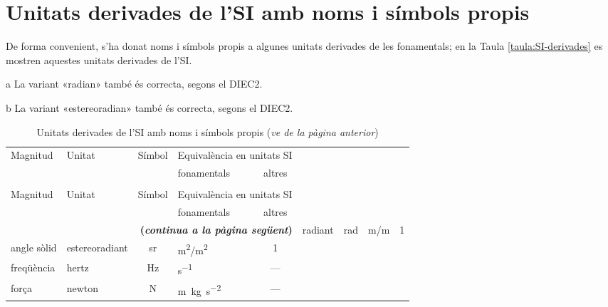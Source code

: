 \section{Unitats derivades de l'SI amb noms i símbols propis}

De forma convenient, s'ha donat noms i símbols propis a algunes unitats derivades de les fonamentals; en la Taula \vref{taula:SI-derivades} es mostren aquestes unitats derivades de l'SI.

\begin{ThreePartTable}
\begin{TableNotes}
    \item[a] {\footnotesize La variant «radian» també és correcta, segons el DIEC2.}
    \item[b] {\footnotesize La variant «estereoradian» també és correcta, segons el DIEC2.}
\end{TableNotes}
\begin{longtable}[h]{llclc}
   \caption{\label{taula:SI-derivades} Unitats derivades de
   l'SI amb noms i símbols propis}\\
   \toprule[1pt]
    \multirow{2}{15mm}{\rule{0mm}{6mm}Magnitud} & \multirow{2}{15mm}{\rule{0mm}{6mm}Unitat}  &
    \multirow{2}{15mm}{\rule{0mm}{6mm}Símbol}  & \multicolumn{2}{c}{Equivalència en unitats SI}\\
    \cmidrule(rl){4-5}
    &  &   & fonamentals & altres\\
   \midrule
   \endfirsthead
   \caption[]{Unitats derivades de l'SI amb noms i símbols propis (\emph{ve de la pàgina
   anterior})}\\
   \toprule[1pt]
    \multirow{2}{15mm}{\rule{0mm}{6mm}Magnitud} & \multirow{2}{15mm}{\rule{0mm}{6mm}Unitat}  &
    \multirow{2}{15mm}{\rule{0mm}{6mm}Símbol}  & \multicolumn{2}{c}{Equivalència en unitats SI}\\
    \cmidrule(rl){4-5}
    &  &  & fonamentals & altres\\
   \midrule
   \endhead
   \midrule
   \multicolumn{5}{r}{\sffamily\bfseries\color{NavyBlue}(\emph{continua a la pàgina següent})}
   \endfoot
   \insertTableNotes
   \endlastfoot
   angle pla & radiant\tnote{a} & rad   & \si{m/m} & 1\\
   angle sòlid & estereoradiant\tnote{b} & sr & \si{m^2/m^2}  & 1 \\
   freqüència & hertz & Hz & \si{s^{-1}} & --- \\
   força & newton & N & \si{m.kg.s^{-2}} & --- \\

\end{longtable}
\end{ThreePartTable}
